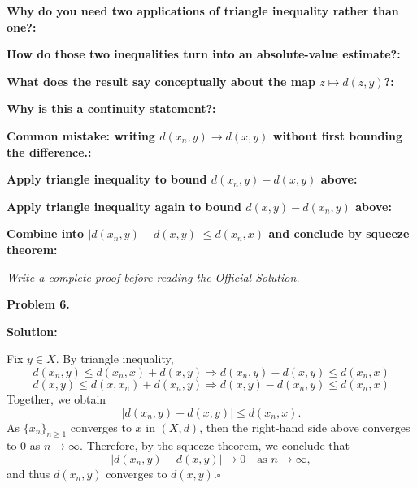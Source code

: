 \documentclass[12pt]{article}
\newcommand{\fillfield}[1]{%
  \par\noindent\textbf{#1:}\enspace\hrulefill\par\vspace{3pt}%
}
\newcommand{\writespace}[1]{\vspace{#1}}
\begin{document}
\bigskip

\begin{tcolorbox}[
  enhanced, breakable,
  colback  = pass3orange,
  colframe = orange!65!black,
  fonttitle = \bfseries,
  title = {Pass 3 \enspace\textbf{--}\enspace Self-Explanation}
]
\fillfield{Why do you need two applications of triangle inequality rather than one?}
\fillfield{How do those two inequalities turn into an absolute-value estimate?}
\fillfield{What does the result say conceptually about the map $z\mapsto d(z,y)$?}
\fillfield{Why is this a continuity statement?}
\fillfield{Common mistake: writing $d(x_n,y)\to d(x,y)$ without first bounding the difference.}
\end{tcolorbox}

\newpage

\begin{tcolorbox}[
  enhanced, breakable,
  colback  = pass4purple,
  colframe = purple!55!black,
  fonttitle = \bfseries,
  title = {Pass 4 \enspace\textbf{--}\enspace Skeleton Proof}
]
\noindent\textbf{Apply triangle inequality to bound $d(x_n,y)-d(x,y)$ above:}\par
\writespace{1.2cm}
\noindent\textbf{Apply triangle inequality again to bound $d(x,y)-d(x_n,y)$ above:}\par
\writespace{1.2cm}
\noindent\textbf{Combine into $|d(x_n,y)-d(x,y)|\le d(x_n,x)$ and conclude by squeeze theorem:}\par
\writespace{1.4cm}
\end{tcolorbox}

\newpage

\begin{tcolorbox}[
  enhanced, breakable,
  colback  = pass5gray,
  colframe = black!38,
  fonttitle = \bfseries,
  title = {Pass 5 \enspace\textbf{--}\enspace Full Proof Attempt}
]
\small\itshape Write a complete proof before reading the Official Solution.\par
\normalfont\normalsize
\writespace{19cm}
\end{tcolorbox}

\newpage

\begin{tcolorbox}[
  enhanced, breakable,
  colback  = solgreen,
  colframe = green!45!black,
  fonttitle = \bfseries,
  title = {\textsc{Official Solution}\hfill Homework 9 -- Solutions}
]
\textbf{Problem 6.}

\medskip\textbf{Solution:}

\medskip
Fix $y \in X$. By triangle inequality,
\[
  d(x_n, y) \le d(x_n, x) + d(x, y) \Longrightarrow d(x_n, y) - d(x, y) \le d(x_n, x)
\]
\[
  d(x, y) \le d(x, x_n) + d(x_n, y) \Longrightarrow d(x, y) - d(x_n, y) \le d(x_n, x)
\]
Together, we obtain
\[
  |d(x_n, y) - d(x, y)| \le d(x_n, x).
\]
As $\{x_n\}_{n\ge1}$ converges to $x$ in $(X, d)$, then the right-hand side above converges to $0$ as $n \to \infty$.
Therefore, by the squeeze theorem, we conclude that
\[
  |d(x_n, y) - d(x, y)| \to 0 \quad \text{as } n \to \infty,
\]
and thus $d(x_n, y)$ converges to $d(x, y)$.\hfill$\square$
\end{tcolorbox}
\end{document}
